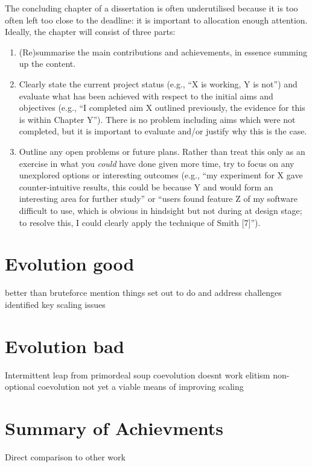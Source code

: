 \noindent
{
	\color{red}
The concluding chapter of a dissertation is often underutilised because it
is too often left too close to the deadline: it is important to allocation
enough attention.  Ideally, the chapter will consist of three parts:

\begin{enumerate}
\item (Re)summarise the main contributions and achievements, in essence
      summing up the content.
\item Clearly state the current project status (e.g., ``X is working, Y
      is not'') and evaluate what has been achieved with respect to the
      initial aims and objectives (e.g., ``I completed aim X outlined
      previously, the evidence for this is within Chapter Y'').  There
      is no problem including aims which were not completed, but it is
      important to evaluate and/or justify why this is the case.
\item Outline any open problems or future plans.  Rather than treat this
      only as an exercise in what you {\em could} have done given more
      time, try to focus on any unexplored options or interesting outcomes
      (e.g., ``my experiment for X gave counter-intuitive results, this
      could be because Y and would form an interesting area for further
      study'' or ``users found feature Z of my software difficult to use,
      which is obvious in hindsight but not during at design stage; to
      resolve this, I could clearly apply the technique of Smith [7]'').
\end{enumerate}
}

\section{Evolution good}
better than bruteforce
mention things set out to do and address challenges
identified key scaling issues

\section{Evolution bad}
Intermittent leap from primordeal soup
coevolution doesnt work
elitism non-optional
coevolution not yet a viable means of improving scaling

\section{Summary of Achievments}

Direct comparison to other work

